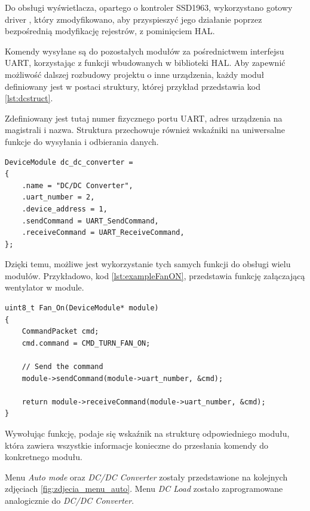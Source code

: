 Do obsługi wyświetlacza, opartego o kontroler SSD1963, wykorzystano gotowy driver \cite{SSD1963_DRIVER}, który zmodyfikowano, aby przyspieszyć jego 
działanie poprzez bezpośrednią modyfikację rejestrów, z pominięciem HAL.

Komendy wysyłane są do pozostałych modułów za pośrednictwem interfejsu UART, korzystając z funkcji
wbudowanych w biblioteki HAL. Aby zapewnić możliwość dalszej rozbudowy projektu o inne urządzenia, 
każdy moduł definiowany jest w postaci struktury, której przykład przedstawia kod \ref{lst:dcstruct}.

Zdefiniowany jest tutaj numer fizycznego portu UART, adres urządzenia na magistrali i nazwa.
Struktura przechowuje również wskaźniki na uniwersalne funkcje do wysyłania i odbierania danych.

\begin{lstlisting}[label=lst:dcstruct,caption=Przykładowa struktura definiująca moduł., float,frame=tb]
DeviceModule dc_dc_converter =
{
    .name = "DC/DC Converter",
    .uart_number = 2,
    .device_address = 1,
    .sendCommand = UART_SendCommand,
    .receiveCommand = UART_ReceiveCommand,
};
\end{lstlisting}

Dzięki temu, możliwe jest wykorzystanie tych samych funkcji do obsługi wielu modułów. Przykładowo, kod \ref{lst:exampleFanON},
przedstawia funkcję załączającą wentylator w module.

\begin{lstlisting}[label=lst:exampleFanON,caption=Przykładowa funkcja załączająca wentylator w module, float,frame=tb]
uint8_t Fan_On(DeviceModule* module)
{
    CommandPacket cmd;
    cmd.command = CMD_TURN_FAN_ON;

    // Send the command
    module->sendCommand(module->uart_number, &cmd);

    return module->receiveCommand(module->uart_number, &cmd);
}
\end{lstlisting}

Wywołując funkcję, podaje się wskaźnik na strukturę odpowiedniego modułu, która zawiera wszystkie informacje konieczne do
przesłania komendy do konkretnego modułu.

Menu \textit{Auto mode} oraz \textit{DC/DC Converter} zostały przedstawione na kolejnych zdjęciach \ref{fig:zdjecia_menu_auto}.
Menu \textit{DC Load} zostało zaprogramowane analogicznie do \textit{DC/DC Converter}.


